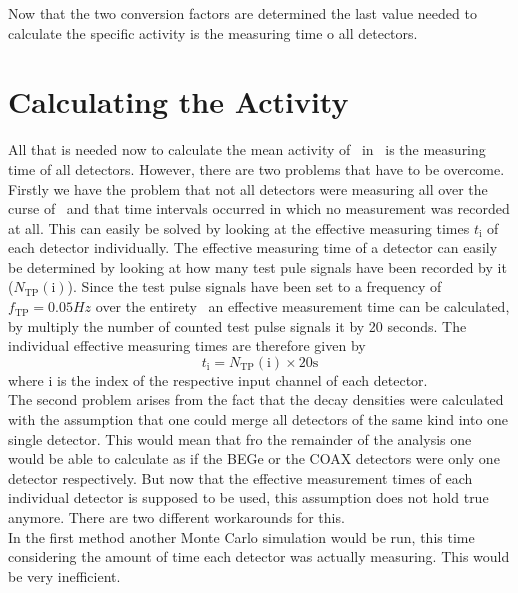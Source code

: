 \documentclass[encoding=utf8,british]{tumphthesis}
\begin{document}
Now that the two conversion factors are determined the last value needed to calculate the specific activity is the measuring time o all detectors.
\\



\section{Calculating the Activity}
\label{sec:CalcActiv}

All that is needed now to calculate the mean activity of \Kr\ in \PII\ is the measuring time of all detectors.
However, there are two problems that have to be overcome.
Firstly we have the problem that not all detectors were measuring all over the curse of \PII\ and that time intervals occurred in which no measurement was recorded at all.
This can easily be solved by looking at the effective measuring times $t_\mathrm{i}$ of each detector individually.
The effective measuring time of a detector can easily be determined by looking at how many test pule signals have been recorded by it ($N_{\mathrm{TP}}(\mathrm{i})$). 
Since the test pulse signals have been set to a frequency of $f_\mathrm{TP} = 0.05\unit{Hz} $ over the entirety \PII\, an effective measurement time can be calculated, by multiply the number of counted test pulse signals it by 20 seconds.
The individual effective measuring times are therefore given by
\begin{equation*}
    t_\mathrm{i} = N_{\mathrm{TP}}(\mathrm{i}) \times 20\mathrm{s}
\end{equation*}
where i is the index of the respective input channel of each detector.
\\

The second problem arises from the fact that the decay densities were  calculated with the assumption that one could merge all detectors of the same kind into one single detector.
This would mean that fro the remainder of the analysis one would be able to calculate as if the BEGe or the COAX detectors were only one detector respectively.
But now that the effective measurement times of each individual detector is supposed to be used, this assumption does not hold true anymore.
There are two different workarounds for this.
\\

In the first method another Monte Carlo simulation would be run, this time considering the amount of time each detector was actually measuring.
This would be very inefficient.
\\
\end{document}
